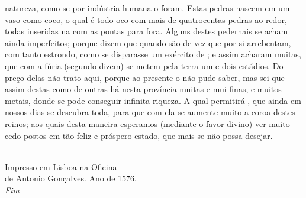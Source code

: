 natureza, como se por indústria humana o foram. Estas pedras nascem em
um vaso como coco, o qual é todo oco com mais de quatrocentas pedras			%
ao redor, todas inseridas na  com as pontas para fora. Alguns
destes pedernais se acham ainda imperfeitos; porque dizem que quando			%
são de vez que por si arrebentam, com tanto estrondo, como se
disparasse um exército de ; e assim acharam muitas, que com a
fúria (segundo dizem) se metem pela terra um e dois estádios. Do preço
delas não trato aqui, porque ao presente o não pude saber, mas sei que
assim destas como de outras há nesta província muitas e mui finas, e
muitos metais, donde se pode conseguir infinita riqueza. A qual			%
permitirá , que ainda em nossos dias se descubra toda, para que com
ela se aumente muito a coroa destes reinos; aos quais desta maneira
esperamos (mediante o favor divino) ver muito cedo postos em tão feliz
e próspero estado, que mais se não possa desejar.
\ \\ 
\ \\


\begin{center}
Impresso em Lisboa na Oficina\\
de Antonio Gonçalves.
Ano de 1576.\\
\textit{Fim}
\end{center}

%
%
%
